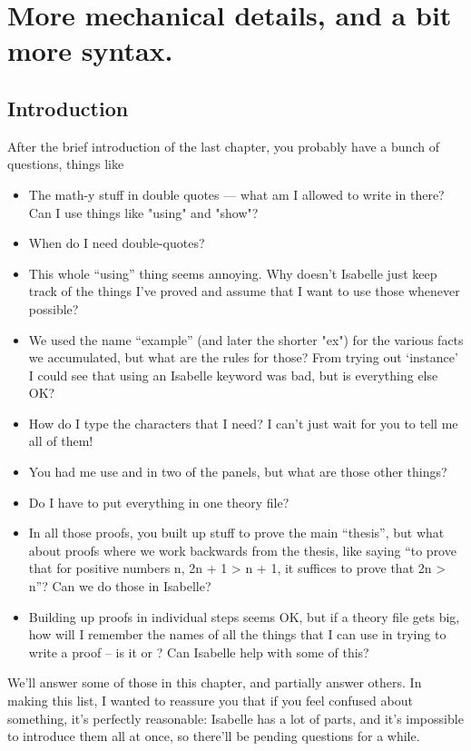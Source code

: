 \chapter{More mechanical details, and a bit more syntax.}
\section{Introduction}
After the brief introduction of the last chapter, you probably have a bunch of questions, things like 
\begin{itemize}
\item    
The math-y stuff in double quotes --- what am I allowed to write in there? Can I use things like "using" and "show"? 
\item    
When do I need double-quotes? 
\item    
This whole ``using'' thing seems annoying. Why doesn't Isabelle just keep track of the things I've proved and assume that I want to use those whenever possible? 
\item    
We used the name ``example'' (and later the shorter "ex") for the various facts we accumulated, but what are the rules for those? From trying out `instance' I could see that using an Isabelle keyword was bad, but is everything else OK? 
\item    
How do I type the characters that I need? I can't just wait for you to tell me all of them!
\item    
You had me use  and  in two of the panels, but what are those other things? 
\item    
Do I have to put everything in one theory file?
\item    
In all those proofs, you built up stuff to prove the main ``thesis'', but what about proofs where we work backwards from the thesis, like saying ``to prove that for positive numbers n,  2n + 1 > n + 1, it suffices to prove  that 2n > n''? Can we do those in Isabelle? 
\item    
Building up proofs in individual steps seems OK, but if a theory file gets big, how will I remember the names of all the things that I can use in trying to write a proof -- is it  or ? Can Isabelle help with some of this?
\end{itemize}

We'll answer some of those in this chapter, and partially answer others. In making this list, I wanted to reassure you that if you feel confused about something, it's perfectly reasonable: Isabelle has a lot of parts, and it's impossible to introduce them all at once, so there'll be pending questions for a while.

